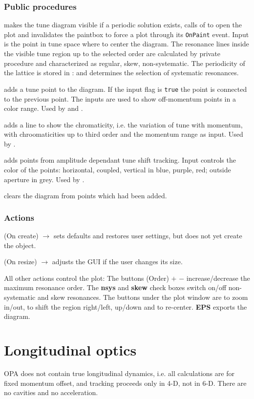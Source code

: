 \documentclass[12pt]{article}
\newcommand\code[1]{{\tt #1}}
\newcommand{\ofld}[1]{\colorbox{black!15}{{{\color{black}\bf #1}}}}
\newcommand{\ofldx}[1]{\colorbox{black!15}{{\color{black}(#1)}}}
\newcommand\guico[1]{{\color{blue}\code{#1}}}
\newcommand\guifco[1]{{\color{violet}\code{#1}}}
\newcommand{\unico}[1]{{\color{burntorange}\code{#1}}}
\newcommand{\evcodx}[2]{\ofldx{#1} $\rightarrow$ \guico{#2}}
\newcommand{\vrcod}[2]{\opauni{#1}:\unico{#2}}
\newcommand{\opagui}[1]{\colorbox{blue!20}{{\color{black}\code{#1}}}}
\newcommand{\ogui}[1]{\hyperref[#1]{\opagui{#1}}}
\newcommand{\opaguif}[1]{\colorbox{violet!30}{{\color{black}\code{#1}}}}
\newcommand{\oguif}[1]{\hyperref[#1]{\opaguif{#1}}}
\newcommand{\opauni}[1]{\colorbox{orange!30}{{\color{black}\code{#1}}}}
\newcommand{\act}[1]{\subsubsection*{Actions} #1}
\newcommand{\ppro}[1]{\subsubsection*{Public procedures} #1}
\begin{document}
\ppro{
\guico{Diagram} makes the tune diagram visible if a periodic solution exists, calls \guifco{OpenPlot} of \oguif{comfigureframe} to open the plot and invalidates the paintbox to force a plot through its \code{OnPaint} event. Input is the point in tune space where to center the diagram.  The resonance lines inside the visible tune region up to the selected order are calculated by private procedure \unico{getLines} and characterized as regular, skew, non-systematic.  The periodicity of the lattice is stored in \vrcod{globlib}{NPer} and determines the selection of systematic resonances. 

\guico{AddTunePoint} adds a tune point to the diagram. If the input flag \guico{connect} is \code{true} the point is connected to the previous point. The inputs \guico{dpp, dppmax} are used to show off-momentum points in a color range. Used by \ogui{opalinop} and \ogui{opamomentum}.

\guico{AddChromLine} adds a line to show the chromaticity, i.e. the variation of tune with momentum, with chroomaticities up to third order and the momentum range as input. Used by \ogui{opachroma}.

\guico{AddTushPoint} adds points from amplitude dependant tune shift tracking. Input \guico{xmy} controls the color of the points: horizontal, coupled, vertical in blue, purple, red; outside aperture in grey. Used by \ogui{opatrackps}.

\guico{Refresh} clears the diagram from points which had been added.
}
\act{
\evcodx{On create}{FormCreate} sets defaults and restores user settings, but does not yet create the \unico{vplot} object.

\evcodx{On resize}{FormResize} adjusts the GUI if the user changes its size.

All other actions control the plot: The buttons \ofldx{Order} \ofld{$+$} \ofld{$-$} increase/decrease the maximum resonance order. The \ofld{nsys} and \ofld{skew} check boxes switch on/off non-systematic and skew resonances. The buttons under the plot window are to zoom in/out, to shift the region right/left, up/down and to re-center. \ofld{EPS} exports the diagram.
}

\section{\label{secmomo}Longitudinal optics}
OPA does not contain true longitudinal dynamics, i.e. all calculations are for fixed momentum offset, and tracking proceeds only in 4-D, not in 6-D. There are no cavities and no acceleration.
\end{document}
